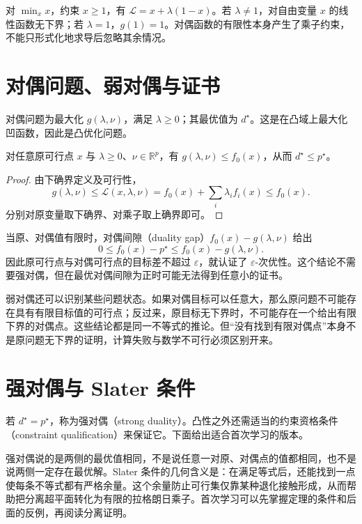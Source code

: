 \documentclass[UTF8,12pt,a4paper,fontset=fandol]{ctexbook}
\begin{document}
\begin{example}
对 $\min_x x$，约束 $x\geq1$，有 $\mathcal L=x+\lambda(1-x)$。若 $\lambda\ne1$，对自由变量 $x$ 的线性函数无下界；若 $\lambda=1$，$g(1)=1$。对偶函数的有限性本身产生了乘子约束，不能只形式化地求导后忽略其余情况。
\end{example}

\section{对偶问题、弱对偶与证书}

对偶问题为最大化 $g(\lambda,\nu)$，满足 $\lambda\geq0$；其最优值为 $d^\star$。这是在凸域上最大化凹函数，因此是凸优化问题。

\begin{theorem}[弱对偶]
对任意原可行点 $x$ 与 $\lambda\geq0$、$\nu\in\mathbb R^p$，有 $g(\lambda,\nu)\leq f_0(x)$，从而 $d^\star\leq p^\star$。
\end{theorem}
\begin{proof}
由下确界定义及可行性，
\[
 g(\lambda,\nu)\leq\mathcal L(x,\lambda,\nu)
 =f_0(x)+\sum_i\lambda_i f_i(x)\leq f_0(x).
\]
分别对原变量取下确界、对乘子取上确界即可。
\end{proof}

当原、对偶值有限时，对偶间隙（duality gap）$f_0(x)-g(\lambda,\nu)$ 给出
\[
 0\leq f_0(x)-p^\star\leq f_0(x)-g(\lambda,\nu).
\]
因此原可行点与对偶可行点的目标差不超过 $\varepsilon$，就认证了 $\varepsilon$-次优性。这个结论不需要强对偶，但在最优对偶间隙为正时可能无法得到任意小的证书。

弱对偶还可以识别某些问题状态。如果对偶目标可以任意大，那么原问题不可能存在具有有限目标值的可行点；反过来，原目标无下界时，不可能存在一个给出有限下界的对偶点。这些结论都是同一不等式的推论。但“没有找到有限对偶点”本身不是原问题无下界的证明，计算失败与数学不可行必须区别开来。

\section{强对偶与 Slater 条件}

若 $d^\star=p^\star$，称为强对偶（strong duality）。凸性之外还需适当的约束资格条件（constraint qualification）来保证它。下面给出适合首次学习的版本。

强对偶说的是两侧的最优值相同，不是说任意一对原、对偶点的值都相同，也不是说两侧一定存在最优解。Slater 条件的几何含义是：在满足等式后，还能找到一点使每条不等式都有严格余量。这个余量防止可行集仅靠某种退化接触形成，从而帮助把分离超平面转化为有限的拉格朗日乘子。首次学习可以先掌握定理的条件和后面的反例，再阅读分离证明。
\end{document}
